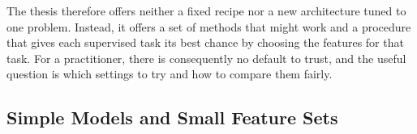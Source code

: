 The thesis therefore offers neither a fixed recipe nor a new architecture tuned to one problem. Instead, it offers a set of methods that might work and a procedure that gives each supervised task its best chance by choosing the features for that task. For a practitioner, there is consequently no default to trust, and the useful question is which settings to try and how to compare them fairly.



\subsection{Simple Models and Small Feature Sets}
